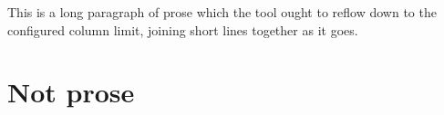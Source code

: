 This is a long paragraph of prose which the tool ought to reflow down to the configured column limit, joining
short
lines
together as it goes.

\section{Not prose}
\label{sec:x}
